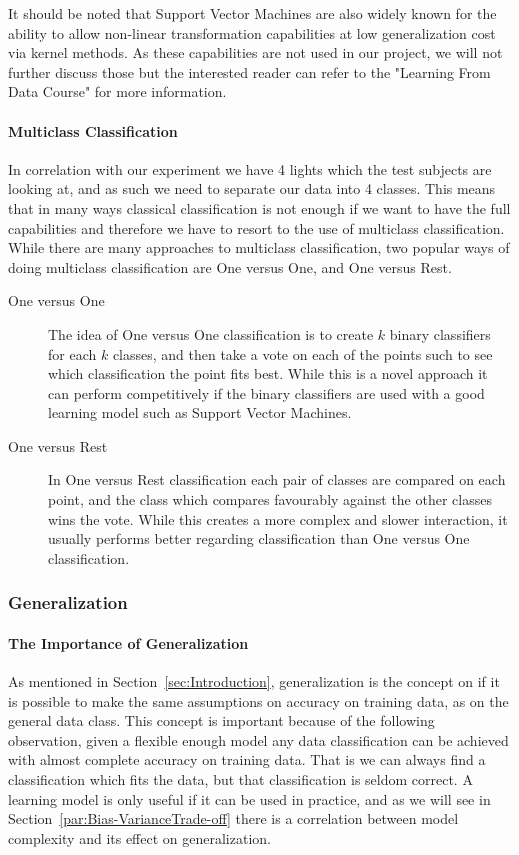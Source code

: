 It should be noted that Support Vector Machines are also widely known for the ability
to allow non-linear transformation capabilities at low generalization cost via kernel methods. As these capabilities are not used in our project, we will not further
discuss those but the interested reader can refer to the "Learning From Data Course"\cite{learningfromdata2012course} for more information.

\paragraph{Multiclass Classification}
\label{par:MulticlassClassification}
In correlation with our experiment we have 4 lights which the test subjects are looking at, and as such we need to separate our data into 4 classes.
This means that in many ways classical classification is not enough if we want to have the full capabilities and therefore we have to resort to the use
of multiclass classification. While there are many approaches to multiclass classification,
two popular ways of doing multiclass classification are One versus One, and One versus Rest\cite{aly2005survey}\cite{scikitlearn2012multiclass}.
\begin{description}
  \item[One versus One] The idea of One versus One classification is to create $k$ binary classifiers for each $k$ classes,
    and then take a vote on each of the points such to see which classification the point fits best.
    While this is a novel approach it can perform competitively if the binary classifiers are used with a good learning model such as Support Vector Machines.
  \item[One versus Rest] In One versus Rest classification each pair of classes are compared on each point, and the class which compares favourably against the other classes
    wins the vote. While this creates a more complex and slower interaction, it usually performs better regarding classification than One versus One classification.
\end{description}

\subsubsection{Generalization}
\label{ssub:Generalization}
\paragraph{The Importance of Generalization}
\label{par:TheImportanceofGeneralization}
As mentioned in Section~\ref{sec:Introduction}, generalization is the concept on if it is possible to make the same assumptions on accuracy on training data,
as on the general data class. This concept is important because of the following observation, given a flexible enough model any data classification can be achieved
with almost complete accuracy on training data. That is we can always find a classification which fits the data, but that classification is seldom correct.
A learning model is only useful if it can be used in practice, and as we will see in Section~\ref{par:Bias-VarianceTrade-off} there is a correlation between model complexity
and its effect on generalization.
